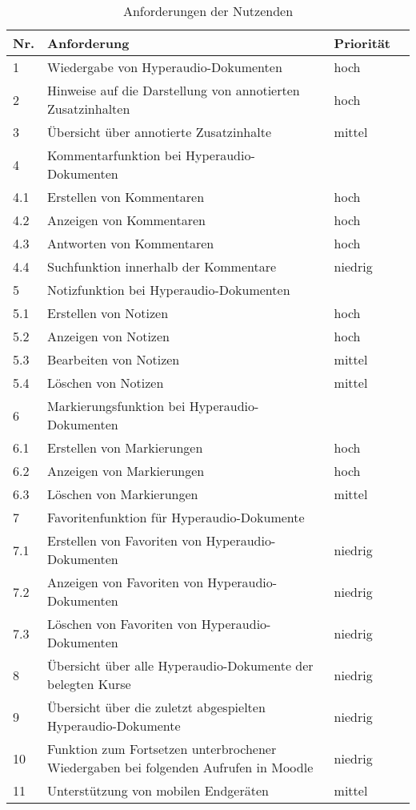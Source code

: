 \begin{table}[!ht]
\def\arraystretch{1.4}
\caption{Anforderungen der Nutzenden}
\label{tab:AnforderungenNutzenden}
\begin{tabularx}{\textwidth}{lXll}      
    \hline
    Nr. & Anforderung & Priorität
    \\\hline
    1 & Wiedergabe von Hyperaudio-Dokumenten & hoch\\
    2 & Hinweise auf die Darstellung von annotierten Zusatzinhalten & hoch\\
    3 & Übersicht über annotierte Zusatzinhalte & mittel\\
    4 & Kommentarfunktion bei Hyperaudio-Dokumenten & \\
    4.1 & Erstellen von Kommentaren & hoch\\
    4.2 & Anzeigen von Kommentaren & hoch\\
    4.3 & Antworten von Kommentaren & hoch\\
    4.4 & Suchfunktion innerhalb der Kommentare & niedrig\\ 
    5 & Notizfunktion bei Hyperaudio-Dokumenten & \\
    5.1 & Erstellen von Notizen & hoch\\
    5.2 & Anzeigen von Notizen & hoch\\
    5.3 & Bearbeiten von Notizen & mittel\\
   	5.4 & Löschen von Notizen & mittel\\
    6 & Markierungsfunktion bei Hyperaudio-Dokumenten & \\
    6.1 & Erstellen von Markierungen & hoch\\
    6.2 & Anzeigen von Markierungen & hoch\\
   	6.3 & Löschen von Markierungen & mittel\\
    7 & Favoritenfunktion für Hyperaudio-Dokumente & \\
    7.1 & Erstellen von Favoriten von Hyperaudio-Dokumenten & niedrig\\
    7.2 & Anzeigen von Favoriten von Hyperaudio-Dokumenten & niedrig\\
    7.3 & Löschen von Favoriten von Hyperaudio-Dokumenten & niedrig\\    
    8 & Übersicht über alle Hyperaudio-Dokumente der belegten Kurse & niedrig\\
    9 & Übersicht über die zuletzt abgespielten Hyperaudio-Dokumente & niedrig\\
    10 &  Funktion zum Fortsetzen unterbrochener Wiedergaben bei folgenden Aufrufen in Moodle & niedrig\\
    11 & Unterstützung von mobilen Endgeräten & mittel\\
    \hline
\end{tabularx}
\end{table}



